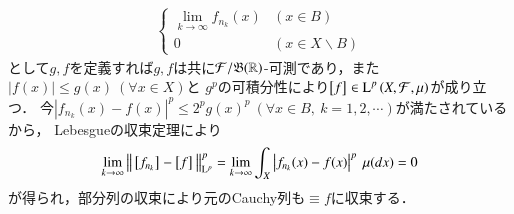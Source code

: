 \begin{prf}
\begin{description}
\begin{align}
\begin{cases}
					\lim\limits_{k \to \infty} f_{n_k}(x) & (x \in B) \\
					0 & (x \in X \backslash B)
				\end{cases}
			\end{align}
			として$g,f$を定義すれば$g,f$は共に$\mathcal{F}/\mathfrak{B}(\mathbb{R})$-可測であり，また$|f(x)| \leq g(x)\ (\forall x \in X)$と
			$g^p$の可積分性により$\left[f\right]_{} \in \operatorname{L}^{p} \left(X,\mathcal{F},\mu\right)$が成り立つ．
			今$\left|f_{n_k}(x) - f(x)\right|^p \leq 2^p g(x)^p\ (\forall x \in B,\ k=1,2,\cdots)$が満たされているから，
			Lebesgueの収束定理により
			\begin{align}
				\lim_{k \to \infty}\left\|\, \left[f_{n_k}\right]_{} - \left[f\right]_{}\, \right\|_{\mathrm{L}^p}^p
				= \lim_{k \to \infty} \int_X \left| f_{n_k}(x) - f(x) \right|^p\ \mu(dx) = 0
			\end{align}
			が得られ，部分列の収束により元のCauchy列も$\equiv{f}{}$に収束する．
			\QED
	\end{description}
\end{prf}
